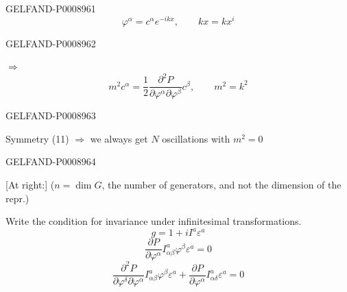 \begin{GelfandAdjacentEvidence}{GELFAND-P000896}{1}
\begin{equation*}
\varphi^\alpha=c^\alpha e^{-ikx},\qquad kx=kx^i \tag{17}
\end{equation*}
\end{GelfandAdjacentEvidence}
\begin{GelfandAdjacentEvidence}{GELFAND-P000896}{2}

$\Rightarrow$
\begin{equation*}
m^2 c^\alpha=\frac12
\frac{\partial^2P}{\partial\varphi^\alpha\partial\varphi^\beta}c^\beta,
\qquad m^2=k^2
\tag{18}
\end{equation*}
\end{GelfandAdjacentEvidence}
\begin{GelfandAdjacentEvidence}{GELFAND-P000896}{3}


Symmetry (11) $\Rightarrow$ we always get $N$ oscillations with $m^2=0$
\end{GelfandAdjacentEvidence}
\begin{GelfandAdjacentEvidence}{GELFAND-P000896}{4}


[At right:] ($n=\dim G$, the number of generators, and not the dimension of the repr.)

Write the condition for invariance under infinitesimal transformations.
\begin{equation*}
g=1+iI^a\varepsilon^a \tag{19}
\end{equation*}
\begin{equation*}
\frac{\partial P}{\partial\varphi^\alpha}
 I^a_{\alpha\beta}\varphi^\beta\varepsilon^a=0 \tag{20}
\end{equation*}
\begin{equation*}
\frac{\partial^2 P}{\partial\varphi^\delta\partial\varphi^\alpha}
 I^a_{\alpha\beta}\varphi^\beta\varepsilon^a+
 \frac{\partial P}{\partial\varphi^\alpha}I^a_{\alpha\delta}\varepsilon^a=0
\tag{21}
\end{equation*}
\end{GelfandAdjacentEvidence}
